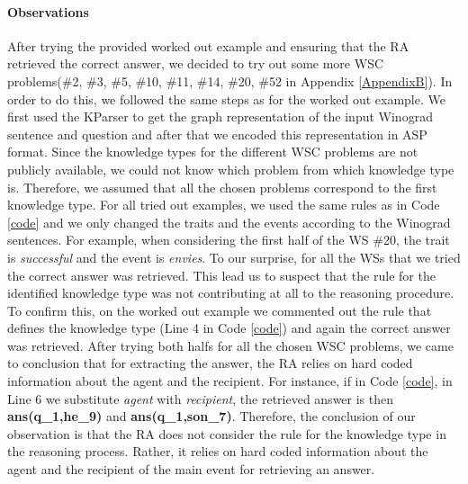 \paragraph{Observations}
After trying the provided worked out example and ensuring that the RA retrieved the correct answer, we decided to try out some more WSC problems(\#2, \#3, \#5, \#10, \#11, \#14, \#20, \#52 in Appendix \ref{AppendixB}).
In order to do this, we followed the same steps as for the worked out example. We first used the KParser to get the graph representation of the input Winograd sentence and question and after that we encoded this representation in ASP format. Since the knowledge types for the different WSC problems are not publicly available, we could not know which problem from which knowledge type is. Therefore, we assumed that all the chosen problems correspond to the first knowledge type. For all tried out examples, we used the same rules as in Code \ref{code} and we only changed the traits and the events according to the Winograd sentences. For example, when considering the first half of the WS \#20, the trait is \textit{successful} and the event is \textit{envies}. To our surprise, for all the WSs that we tried the correct answer was retrieved. This lead us to suspect that the rule for the identified knowledge type was not contributing at all to the reasoning procedure. 
To confirm this, on the worked out example we commented out the rule that defines the knowledge type (Line 4 in Code \ref{code}) and again the correct answer was retrieved. After trying both halfs for all the chosen WSC problems, we came to conclusion that for extracting the answer, the RA relies on hard coded information about the agent and the recipient. For instance, if in Code \ref{code}, in Line 6 we substitute \textit{agent} with \textit{recipient}, the retrieved answer is then \textbf{ans(q\_1,he\_9)} and \textbf{ans(q\_1,son\_7)}.
Therefore, the conclusion of our observation is that the RA does not consider the rule for the knowledge type in the reasoning process. Rather, it relies on hard coded information about the agent and the recipient of the main event for retrieving an answer. 

